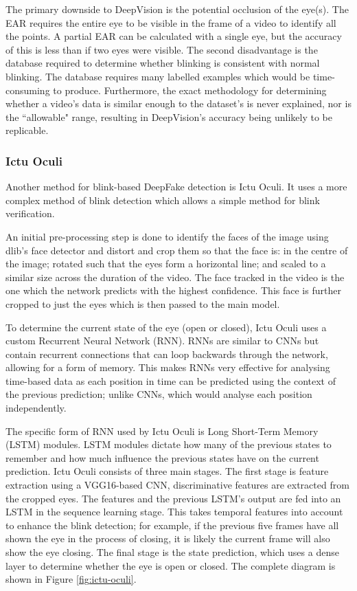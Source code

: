 The primary downside to DeepVision is the potential occlusion of the eye(s). The EAR requires the entire eye to be visible in the frame of a video to identify all the points. A partial EAR can be calculated with a single eye, but the accuracy of this is less than if two eyes were visible. The second disadvantage is the database required to determine whether blinking is consistent with normal blinking. The database requires many labelled examples which would be time-consuming to produce. Furthermore, the exact methodology for determining whether a video's data is similar enough to the dataset's is never explained, nor is the ``allowable" range, resulting in DeepVision's accuracy being unlikely to be replicable.

\subsubsection{Ictu Oculi}

Another method for blink-based DeepFake detection is Ictu Oculi\cite{li2018ictu}. It uses a more complex method of blink detection which allows a simple method for blink verification. 

An initial pre-processing step is done to identify the faces of the image using dlib's\cite{king2009dlib} face detector and distort and crop them so that the face is: in the centre of the image; rotated such that the eyes form a horizontal line; and scaled to a similar size across the duration of the video. The face tracked in the video is the one which the network predicts with the highest confidence. This face is further cropped to just the eyes which is then passed to the main model.

To determine the current state of the eye (open or closed), Ictu Oculi uses a custom Recurrent Neural Network (RNN). RNNs are similar to CNNs but contain recurrent connections that can loop backwards through the network, allowing for a form of memory. This makes RNNs very effective for analysing time-based data as each position in time can be predicted using the context of the previous prediction; unlike CNNs, which would analyse each position independently.

The specific form of RNN used by Ictu Oculi is Long Short-Term Memory (LSTM) modules\cite{hochreiter1997long}. LSTM modules dictate how many of the previous states to remember and how much influence the previous states have on the current prediction. Ictu Oculi consists of three main stages. The first stage is feature extraction using a VGG16-based CNN, discriminative features are extracted from the cropped eyes. The features and the previous LSTM's output are fed into an LSTM in the sequence learning stage. This takes temporal features into account to enhance the blink detection; for example, if the previous five frames have all shown the eye in the process of closing, it is likely the current frame will also show the eye closing. The final stage is the state prediction, which uses a dense layer to determine whether the eye is open or closed. The complete diagram is shown in Figure \ref{fig:ictu-oculi}.

